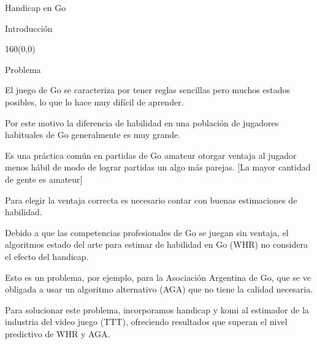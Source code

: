 \documentclass[shownotes,aspectratio=169]{beamer}
\begin{document}
\color{black!85}
\small
{}


\begin{frame}[plain]
\begin{center}
 \Huge Handicap en Go
\end{center}
\end{frame}

\begin{frame}[plain]
 \centering
 \LARGE Introducci\'on
 
\end{frame}

\begin{frame}[plain]
\begin{textblock}{160}(0,0)
\begin{center}
 \Large Problema
\end{center}
\end{textblock}
 \vspace{0.75cm} \pause
 
  El juego de Go se caracteriza por tener reglas sencillas pero muchos estados posibles, lo que lo hace muy dif\'icil de aprender.
  
  \vspace{0.3cm} \pause
  
  Por este motivo la diferencia de habilidad en una poblaci\'on de jugadores habituales de Go generalmente es muy grande.
  
 \vspace{0.3cm} \pause
 
  Es una pr\'actica com\'un en partidas de Go amateur otorgar ventaja al jugador menos h\'abil de modo de lograr partidas un algo m\'as parejas. [La mayor cantidad de gente es amateur]
 
 \vspace{0.3cm} \pause
 
  Para elegir la ventaja correcta es necesario contar con buenas estimaciones de habilidad.
  
 \vspace{0.3cm} \pause
  
  Debido a que las competencias profesionales de Go se juegan sin ventaja, el algoritmos estado del arte para estimar de habilidad en Go (WHR) no considera el efecto del handicap.
 
 \vspace{0.3cm} \pause
 
  Esto es un problema, por ejemplo, para la Asociaci\'on Argentina de Go, que se ve obligada a usar un algoritmo alternativo (AGA) que no tiene la calidad necesaria.
  
 \vspace{0.3cm} \pause
 
  Para solucionar este problema, incorporamos handicap y komi al estimador de la industria del video juego (TTT), ofreciendo resultados que superan el nivel predictivo de WHR y AGA. 
 
\end{frame}
\end{document}
